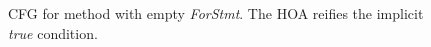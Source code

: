 \begin{figure}[H]
\hspace{-0.5cm}
 \scalebox{0.7}{
 	
 }
\caption{CFG for method with empty \emph{ForStmt}. The HOA  reifies the implicit \emph{true} condition.
}
\label{fig:ForStmt}
\end{figure}



